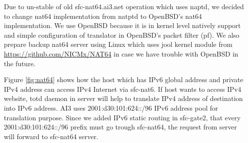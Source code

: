 \documentclass{article}
\begin{document}
Due to un-stable of old sfc-nat64.ai3.net operation which uses naptd, we decided to change nat64 implementation from natptd to OpenBSD's nat64 implementation.  
We use OpenBSD because it is in kernel level natively support and simple configuration of translator in OpenBSD's packet filter (pf).
We also prepare backup nat64 server using Linux which uses jool kernel module from \url{https://github.com/NICMx/NAT64} in case we have trouble with OpenBSD in the future. 

Figure \ref{fig:nat64} shows how the host which has IPv6 global address and private IPv4 address can access IPv4 Internet via sfc-nat6. 
If host wants to access IPv4 website, totd daemon in server will help to translate IPv4 address of destination into IPv6 address.
AI3 uses 2001:d30:101:624::/96 IPv6 address pool for translation purpose.  
Since we added IPv6 static routing in sfc-gate2, that every 2001:d30:101:624::/96 prefix must go trough sfc-nat64, the request from server will forward to sfc-nat64 server. 
\end{document}
